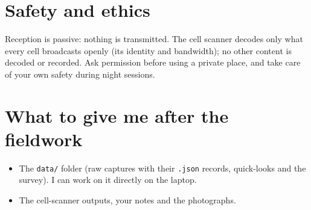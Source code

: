 \documentclass[11pt,a4paper]{article}
\newcommand{\cmd}[1]{\texttt{#1}}
\begin{document}
\section{Safety and ethics}
Reception is passive: nothing is transmitted. The cell scanner decodes only what every cell broadcasts openly (its identity and bandwidth); no other content is decoded or recorded. Ask permission before using a private place, and take care of your own safety during night sessions.

\section{What to give me after the fieldwork}
\begin{itemize}
\item The \cmd{data/} folder (raw captures with their \cmd{.json} records, quick-looks and the survey). I can work on it directly on the laptop.
\item The cell-scanner outputs, your notes and the photographs.
\end{itemize}
\end{document}
